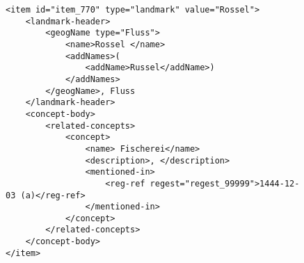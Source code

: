 \begin{figure}
\begin{verbatim}
<item id="item_770" type="landmark" value="Rossel">
    <landmark-header>
        <geogName type="Fluss">
            <name>Rossel </name>
            <addNames>(
                <addName>Russel</addName>)
            </addNames>
        </geogName>, Fluss 
    </landmark-header>
    <concept-body>
        <related-concepts>
            <concept>
                <name> Fischerei</name>
                <description>, </description>
                <mentioned-in>
                    <reg-ref regest="regest_99999">1444-12-03 (a)</reg-ref>
                </mentioned-in>
            </concept>
        </related-concepts>
    </concept-body>
</item>
\end{verbatim}
\end{figure}

